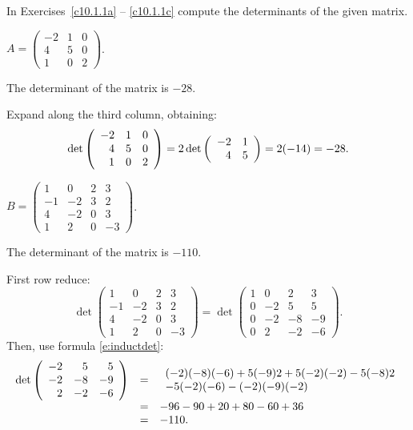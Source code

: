 \documentclass{ximera}
\begin{document}
\noindent  In Exercises~\ref{c10.1.1a} -- \ref{c10.1.1c} compute the 
determinants of the given matrix.
\begin{exercise} \label{c10.1.1a}
$A = \left(\begin{array}{rrr} -2 & 1 & 0 \\ 4 & 5& 0 \\ 1 & 0 & 2
\end{array} \right)$.

\begin{solution}

\ans The determinant of the matrix is $-28$.

\soln Expand along the third column, obtaining:
\[
\det\left(\begin{array}{rrr} -2 & 1 & 0 \\ 4 & 5 & 0 \\ 1 & 0 & 2\end{array}\right) = 2\det\left(\begin{array}{rr} -2 & 1\\ 4 &5\end{array}\right)
= 2(-14) = -28.
\]

\end{solution}
\end{exercise} 
\begin{exercise} \label{c10.1.1b}
$B = \left(\begin{array}{rrrr} 1 & 0 & 2 & 3 \\ -1 & -2 & 3 & 2
\\ 4 & -2 & 0 & 3 \\ 1 & 2 & 0 & -3 \end{array} \right)$.

\begin{solution}

\ans The determinant of the matrix is $-110$.

\soln First row reduce:
\[
\det\left(\begin{array}{rrrr}
1 & 0 & 2 & 3 \\ 
-1 & -2 & 3 & 2 \\
4 & -2 & 0 & 3 \\
1 & 2 & 0 & -3 \end{array}\right) =
\det\left(\begin{array}{rrrr}
1 & 0 & 2 & 3 \\ 
0 & -2 & 5 & 5 \\
0 & -2 & -8 & -9 \\
0 & 2 & -2 & -6 \end{array}\right).
\]
Then, use formula \eqref{e:inductdet}:
\[ \begin{array}{rcl}
\det\left(\begin{array}{rrr} -2 & 5 & 5 \\ -2 & -8 & -9 \\ 2 & -2 & -6\end{array}\right) & = &
\begin{array}{l}
(-2)(-8)(-6) + 5(-9)2 + 5(-2)(-2) - 5(-8)2 \\
- 5(-2)(-6) - (-2)(-9)(-2) \end{array} \\
& = & -96 - 90 + 20 + 80 - 60 + 36 \\
& = & -110.
\end{array}
\]

\end{solution}
\end{exercise}
\end{document}
